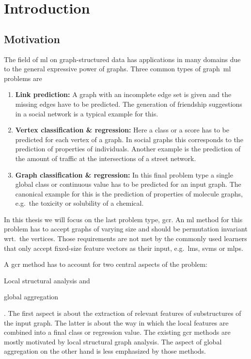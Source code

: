 \chapter{Introduction}%
\label{sec:intro}

\setcounter{page}{1}			%

\section{Motivation}%
\label{sec:intro:motivation}

The field of \ac{ml} on graph-structured data has applications in many domains due to the general expressive power of graphs.
Three common types of graph~\ac{ml} problems are
\begin{enumerate}[label=\textbf{\arabic*.}]
	\item \textbf{Link prediction:}
		A graph with an incomplete edge set is given and the missing edges have to be predicted.
		The generation of friendship suggestions in a social network is a typical example for this.
	\item \textbf{Vertex classification \& regression:}
		Here a class or a score has to be predicted for each vertex of a graph.
		In social graphs this corresponds to the prediction of properties of individuals.
		Another example is the prediction of the amount of traffic at the intersections of a street network.
	\item \textbf{Graph classification \& regression:}
		In this final problem type a single global class or continuous value has to be predicted for an input graph.
		The canonical example for this is the prediction of properties of molecule graphs, e.g.\ the toxicity or solubility of a chemical.
\end{enumerate}
In this thesis we will focus on the last problem type, \acf{gcr}.
An \ac{ml} method for this problem has to accept graphs of varying size and should be permutation invariant wrt.\ the vertices.
Those requirements are not met by the commonly used learners that only accept fixed-size feature vectors as their input, e.g.\ \acp*{lm}, \acp{svm} or \acp{mlp}.

A \ac{gcr} method has to account for two central aspects of the problem:
\begin{enumerate*}
	\item Local structural analysis and
	\item global aggregation
\end{enumerate*}.
The first aspect is about the extraction of relevant features of substructures of the input graph.
The latter is about the way in which the local features are combined into a final class or regression value.
The existing \ac{gcr} methods are mostly motivated by local structural graph analysis.
The aspect of global aggregation on the other hand is less emphasized by those methods.

